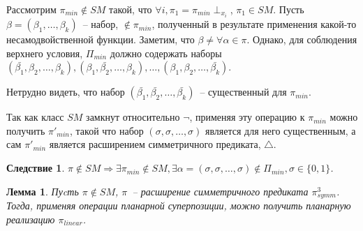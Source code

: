 \documentclass[12pt]{article}
\newtheorem{lemma}[theorem]{Лемма}
\newtheorem{corollary}[theorem]{Следствие}
\newenvironment{proof}[1][Доказательство]{\begin{trivlist}
\item[\hskip \labelsep {\bfseries #1}]}{\end{trivlist}}
\begin{document}
\begin{proof}
Рассмотрим $\pi_{min} \notin SM$ такой, что $\forall i, \pi_1 = \pi_{min} \perp_{x_i}$,
$\pi_1 \in SM$.
Пусть $\beta = (\beta_1, \dots, \beta_k)$~-- набор, $\notin \pi_{min}$, полученный в результате применения какой-то несамодвойственной функции.
Заметим, что $\beta \neq \forall \alpha \in \pi$. Однако, для соблюдения верхнего условия,
$\Pi_{min}$ должно содержать наборы 
$(\bar{\beta_1}, \beta_2, \dots, \beta_k), (\beta_1, \bar{\beta_2}, \dots, \beta_k), \dots, (\beta_1, \beta_2, \dots, \bar{\beta_k})$.

Нетрудно видеть, что набор $(\bar{\beta_1}, \bar{\beta_2}, \dots, \bar{\beta_k})$~-- существенный для $\pi_{min}$.

Так как класс $SM$ замкнут относительно $\neg$, применяя эту операцию к $\pi_{min}$ можно получить $\pi'_{min}$,
такой что набор $(\sigma, \sigma, \dots, \sigma)$ является для него существенным, а сам $\pi'_{min}$ является расширением 
симметричного предиката, $\bigtriangleup$.
\end{proof}

\begin{corollary}
$\pi \notin SM \Longrightarrow \exists \pi_{min} \notin SM, \exists 
\alpha = (\sigma, \sigma, \dots, \sigma) \notin \Pi_{min}, \sigma \in \{0, 1\}$.
\end{corollary}

\begin{lemma}
\label{eq:super_new}
Пуcть $\pi \notin SM$, $\pi$~-- расширение симметричного предиката $\pi_{symm}^3$. 
Тогда, применяя операции планарной суперпозиции, можно получить планарную реализацию $\pi_{linear}$.
\end{lemma}
\end{document}
